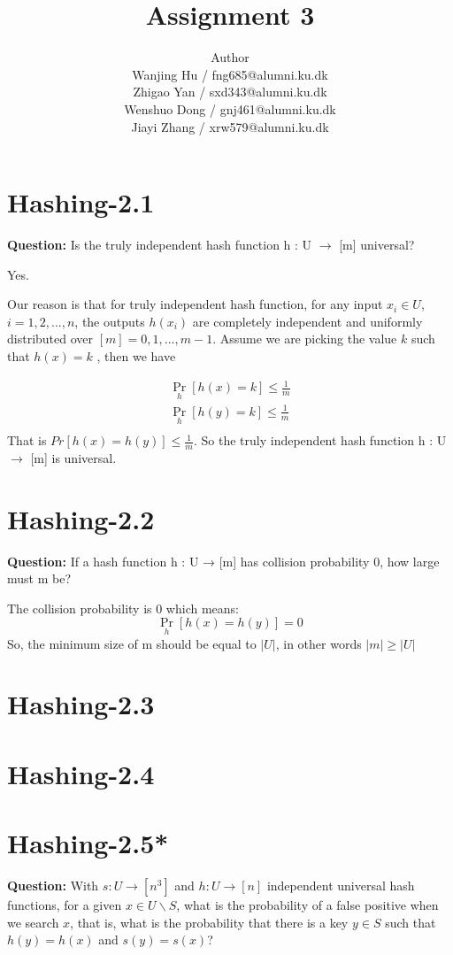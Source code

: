 \documentclass[12pt]{article}
\title{Assignment 3}
\author{Author \\
  Wanjing Hu / fng685@alumni.ku.dk  \\
  Zhigao Yan / sxd343@alumni.ku.dk  \\
  Wenshuo Dong / gnj461@alumni.ku.dk  \\
  Jiayi Zhang / xrw579@alumni.ku.dk \\
}
\begin{document}
\maketitle

\section{Hashing-2.1}
\textbf{Question: } Is the truly independent hash function h : U $\rightarrow$ [m] universal?

Yes. 

Our reason is that for truly independent hash function, for any input $x_i \in U$, $i = 1,2,...,n$, the outputs $h(x_i)$ are completely independent and uniformly distributed over $[m]={0,1,...,m-1}$. Assume we are picking the value $k$ such that $h(x)=k$ , then we have

\begin{equation}
\begin{aligned}
\mathop{Pr} \limits_{h} [h(x)=k] \leq \frac{1}{m}\\
\mathop{Pr} \limits_{h} [h(y)=k] \leq \frac{1}{m}\\
\end{aligned}
\end{equation}
That is $Pr[h(x)=h(y)] \leq \frac{1}{m}$. So the truly independent hash function h : U $\rightarrow$ [m] is universal.

\section{Hashing-2.2}
\textbf{Question:} If a hash function h : U → [m] has collision probability 0, how large must m be?

The collision probability is 0 which means:
\[\mathop{Pr} \limits_{h}[h(x)=h(y)] =0\]
So, the minimum size of m should be equal to \(|U|\), in other words \(|m|\geq|U|\)

\section{Hashing-2.3}

\section{Hashing-2.4 }

\section{Hashing-2.5*}
\textbf{Question: }
With $s: U \rightarrow [n^3]$ and $h : U \rightarrow [n]$ independent universal hash functions, for a given $x \in U \backslash S$, what is the probability of a false positive when we search $x$, that is, what is the probability that there is a key $y \in S$ such that $h(y) = h(x)$ and $s(y) = s(x)$?
\end{document}
